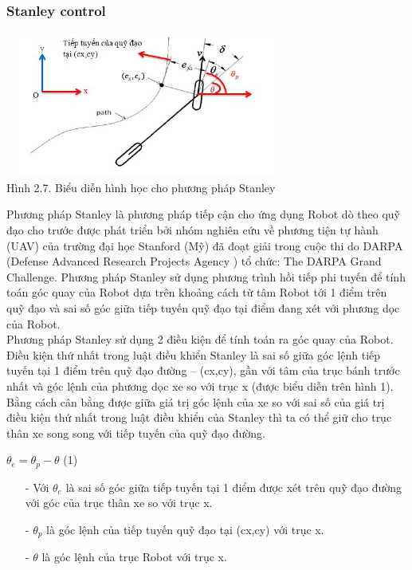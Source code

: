 \documentclass[a4paper, 12pt]{article}
\begin{document}
	\subsubsection{Stanley control}
	\hspace{0.5cm}
	\begin{center}
		\includegraphics[width=350px,height=180px]{images/Stanley}\\
		Hình 2.7. Biểu diễn hình học cho phương pháp Stanley
	\end{center}
	\hspace{0.5cm}
	Phương pháp Stanley là phương pháp tiếp cận cho ứng dụng Robot dò theo quỹ đạo cho trước được phát triển bởi nhóm nghiên cứu về phương tiện tự hành (UAV) của trường đại học Stanford (Mỹ) đã đoạt giải trong cuộc thi do DARPA (Defense Advanced Research Projects Agency ) tổ chức: The DARPA Grand Challenge. Phương pháp Stanley sử dụng phương trình hồi tiếp phi tuyến để tính toán góc quay của Robot dựa trên khoảng cách từ tâm Robot tới 1 điểm trên quỹ đạo và sai số góc giữa tiếp tuyến quỹ đạo tại điểm đang xét với phương dọc của Robot.\\\indent
	Phương pháp Stanley sử dụng 2 điều kiện để tính toán ra góc quay của Robot. Điều kiện thứ nhất trong luật điều khiển Stanley là sai số giữa góc lệnh tiếp tuyến tại 1 điểm trên quỹ đạo đường – (cx,cy), gần với tâm của trục bánh trước nhất và góc lệnh của phương dọc xe so với trục x (được biểu diễn trên hình 1). Bằng cách cân bằng được giữa giá trị góc lệnh của xe so với sai số của giá trị điều kiện thứ nhất trong luật điều khiển của Stanley thì ta có thể giữ cho trục thân xe song song với tiếp tuyến của quỹ đạo đường.\\
	\begin{center}
		$\theta_{e} = \theta_{p} - \theta$ (1)
	\end{center}
	\begin{enumerate}
		\item[-] Với $\theta_{e}$ là sai số góc giữa tiếp tuyến tại 1 điểm được xét trên quỹ đạo đường với góc của trục thân xe so với trục x.
		\item[-] $\theta_{p}$ là góc lệnh của tiếp tuyến quỹ đạo tại (cx,cy) với trục x.
		\item[-] $\theta$ là góc lệnh của trục Robot với trục x.
	\end{enumerate}
\end{document}
